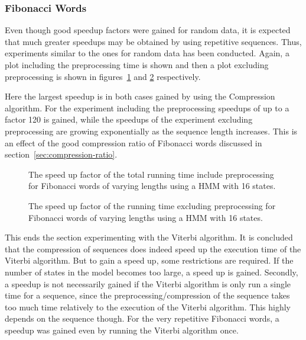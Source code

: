 \subsubsection{Fibonacci Words}

Even though good speedup factors were gained for random data, it is expected
that much greater speedups may be obtained by using repetitive
sequences. Thus, experiments similar to the ones for random data has been
conducted. Again, a plot including the preprocessing time is shown and then a
plot excluding preprocessing is shown in
figures~\ref{fig:fib_speedup_vs_sequence_length} and
\ref{fig:fib_speedup_vs_sequence_length2} respectively.

Here the largest speedup is in both cases gained by using the Compression
algorithm. For the experiment including the preprocessing speedups of up to a
factor 120 is gained, while the speedups of the experiment excluding
preprocessing are growing exponentially as the sequence length
increases. This is an effect of the good compression ratio of Fibonacci words
discussed in section~\ref{sec:compression-ratio}.

\begin{figure}
  \centering
  
  \caption{The speed up factor of the total running time include preprocessing
    for Fibonacci words of varying lengths using a HMM with 16 states.}
  \label{fig:fib_speedup_vs_sequence_length}
\end{figure}

\begin{figure}
  \centering
  
  \caption{The speed up factor of the running time excluding preprocessing for
    Fibonacci words of varying lengths using a HMM with 16 states.}
  \label{fig:fib_speedup_vs_sequence_length2}
\end{figure}

This ends the section experimenting with the Viterbi algorithm. It is concluded
that the compression of sequences does indeed speed up the execution time of
the Viterbi algorithm. But to gain a speed up, some restrictions are
required. If the number of states in the model becomes too large, a speed up is
gained. Secondly, a speedup is not necessarily gained if the Viterbi algorithm
is only run a single time for a sequence, since the preprocessing/compression of
the sequence takes too much time relatively to the execution of the Viterbi
algorithm. This highly depends on the sequence though. For the very repetitive
Fibonacci words, a speedup was gained even by running the Viterbi algorithm once.

